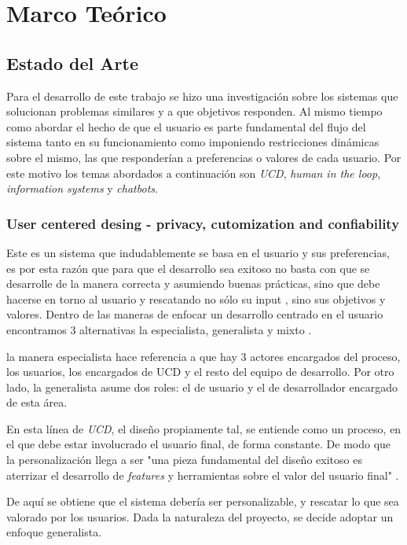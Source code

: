 \chapter{Marco Teórico}\label{mt}
\section{Estado del Arte}
    \par Para el desarrollo de este trabajo se hizo una investigación sobre los sistemas que solucionan problemas similares y a que objetivos responden. Al mismo tiempo como abordar el hecho de que el usuario es parte fundamental del flujo del sistema tanto en su funcionamiento como imponiendo restricciones dinámicas sobre el mismo, las que responderían a preferencias o valores de cada usuario. Por este motivo los temas abordados a continuación son \textit{\acrfull{UCD}}, \textit{human in the loop}, \textit{information systems} y \textit{chatbots}.
    
    \subsection{User centered desing - privacy, cutomization and confiability}
    \par Este es un sistema que indudablemente se basa en el usuario y sus preferencias, es por esta razón que para que el desarrollo sea exitoso no basta con que se desarrolle de la manera correcta y asumiendo buenas prácticas, sino que debe hacerse en torno al usuario y rescatando no sólo su input \cite{Karat1997}, sino sus objetivos y valores. Dentro de las maneras de enfocar un desarrollo centrado en el usuario encontramos 3 alternativas la especialista, generalista y mixto \cite{Fox2008}.
    \par la manera especialista hace referencia a que hay 3 actores encargados del proceso, los usuarios, los encargados de \acrshort{UCD} y el resto del equipo de desarrollo. Por otro lado, la generalista asume dos roles: el de usuario y el de desarrollador encargado de esta área.
    \par En esta línea de \textit{\acrlong{UCD}}, el diseño propiamente tal, se entiende como un proceso, en el que debe estar involucrado el usuario final, de forma constante.
    De modo que la personalización llega a ser "una pieza fundamental del diseño exitoso es aterrizar el desarrollo de \textit{features} y herramientas sobre el valor del usuario final" \cite{Kramer2000}.
    \par De aquí se obtiene que el sistema debería ser personalizable, y rescatar lo que sea valorado por los usuarios. Dada la naturaleza del proyecto, se decide adoptar un enfoque generalista.
    
